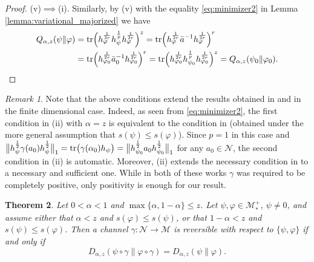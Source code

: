 \documentclass[12pt]{article}
\newtheorem{theorem}{Theorem}[section]
\theoremstyle{definition}
\theoremstyle{remark}
\newtheorem{remark}[theorem]{Remark}
\numberwithin{equation}{section}
\def\Me{\mathcal M}
\def\Ne{\mathcal N}
\def\Tr{\mathrm{tr}}
\def\ffi{\varphi}
\begin{document}
\begin{proof}
(v)$\implies$(i).\enspace
Similarly, by (v) with the equality \eqref{eq:minimizer2} in Lemma
\ref{lemma:variational_majorized} we have
\begin{align*}
Q_{\alpha,z}(\psi\|\ffi)
&=\Tr\Bigl(h_\ffi^{1\over2r}h_\psi^{1\over p}h_\ffi^{1\over2r}\Bigr)^z
=\Tr\Bigl(h_\ffi^{1\over2r}\bar a^{-1}h_\ffi^{1\over2r}\Bigr)^{r} \\
&=\Tr\Bigl(h_{\ffi_0}^{1\over2r}\bar a_0^{-1}h_{\ffi_0}^{1\over2r}\Bigr)^{r}
=\Tr\Bigl(h_{\ffi_0}^{1\over2r}h_{\psi_0}^{1\over p}h_{\ffi_0}^{1\over2r}\Bigr)^z
=Q_{\alpha,z}(\psi_0\|\ffi_0).
\end{align*}
\end{proof}


\begin{remark}\label{rem:conditions} Note that the above conditions extend the results
obtained in \cite{leditzky2017data} and \cite{zhang2020equality} in the finite dimensional case.
Indeed, as seen from \eqref{eq:minimizer2}, the first condition in (ii) with $\alpha=z$ is 
equivalent to the condition in \cite[Theorem 1]{leditzky2017data} (obtained under the more
general assumption that $s(\psi)\le s(\ffi)$). Since $p=1$ in this case and 
$\big\|h_\psi^{1\over2}\gamma(a_0)h_\psi^{1\over2}\big\|_{1}=\Tr
\bigl(\gamma(\alpha_0)h_\psi\bigr)=\big\|h_{\psi_0}^{1\over2}a_0h_{\psi_0}^{1\over2}\big\|_{1}$
for any $a_0\in \Ne$, the second condition in (ii) is automatic.
Moreover, (ii) extends the necessary condition in \cite[Theorem 1.2(2)]{zhang2020equality}
to a necessary and sufficient one. While in both of these works $\gamma$ was required
to be completely positive, only positivity is enough for our result. 
\end{remark}


\begin{theorem}\label{thm:suffle1} Let $0<\alpha<1$ and $\max\{\alpha,1-\alpha\}\le
z$. Let $\psi,\varphi\in \Me_*^+$, $\psi\ne0$, and assume either that $\alpha<z$ and $s(\ffi)\le
s(\psi)$, or that $1-\alpha<z$ and $s(\psi)\le s(\ffi)$. 
Then a channel $\gamma:\Ne \to \Me$ is reversible with respect to
$\{\psi,\varphi\}$ if and only if
\[
D_{\alpha,z}(\psi\circ\gamma\|\varphi\circ\gamma)=D_{\alpha,z}(\psi\|\varphi).
\]
\end{theorem}
\end{document}

